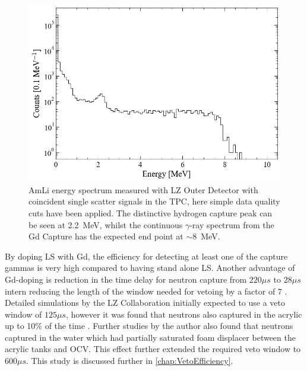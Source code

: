 \begin{figure}[ht]
    \centering
    \includegraphics[width=0.7\linewidth]{figures/LZ/ODEnergySpec.png}
    \caption{AmLi energy spectrum measured with LZ Outer Detector with coincident single scatter signals in the TPC, here simple data quality cuts have been applied. The distinctive hydrogen capture peak can be seen at 2.2~MeV, whilst the continuous $\gamma$-ray spectrum from the Gd Capture has the expected end point at $\mathtt{\sim}$8~MeV.}
    \label{fig:ODEnergySpec}
\end{figure}

By doping LS with Gd, the efficiency for detecting at least one of the capture gammas is very high compared to having stand alone LS. Another advantage of Gd-doping is reduction in the time delay for neutron capture from $220\mu s$ to $28\mu s$ intern reducing the length of the window needed for vetoing by a factor of 7 \cite{LZTDR}. Detailed simulations by the LZ Collaboration initially expected to use a veto window of $125\mu s$, however it was found that neutrons also captured in the acrylic up to 10\% of the time \cite{LZTDR}. Further studies by the author also found that neutrons captured in the water which had partially saturated foam displacer between the acrylic tanks and OCV. This effect further extended the required veto window to $600\mu s$. This study is discussed further in \autoref{chap:VetoEfficiency}.

